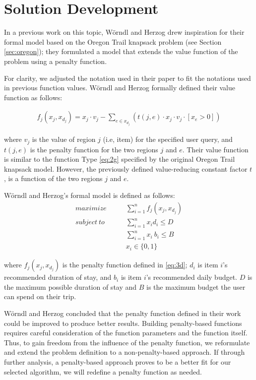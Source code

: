 
\chapter{Solution Development}\label{chapter:analysis}
In a previous work on this topic, Wörndl and Herzog  \parencite{cbrecsys2014} drew inspiration for their formal model based on the Oregon Trail knapsack problem (see Section \ref{sec:oregon}); they formulated a model that extends the value function of the problem using a penalty function.

For clarity, we adjusted the notation used in their paper to fit the notations used in previous function values. Wörndl and Herzog formally defined their value function as follows:

\begin{gather}
 \tag{1} f_j(x_j, x_{d_j}) = x_j \cdot v_j - \sum_{e \in x_{d_j}} ( t(j, e) \cdot x_j \cdot v_j \cdot [x_e > 0])\label{eq:3d}
\end{gather}

where $v_j$ is the value of region $j$ (i.e, item) for the specified user query, and $t(j, e)$ is the penalty function for the two regions $j$ and $e$. Their value function is similar to the function Type \ref{eq:2g} specified by the original Oregon Trail knapsack model. However, the previously defined value-reducing constant factor $t$, is a function of the two regions $j$ and $e$. 

Wörndl and Herzog’s formal model is defined as follows:
\begin{align}
    \tag{1}maximize \qquad  &\sum_{i=1}^n  f_j(x_j, x_{d_j}) \label{eq:3a}\\
    \tag{2}subject \ to \qquad &\sum_{i=1}^n x_i d_i  \leq D \label{eq:3b}\\
    \tag{3}&\sum_{i=1}^n x_i\ b_i \leq B \label{eq:3c}\\
    \tag{4} &x_i \in \{0,1\}
\end{align}

where $f_j(x_j, x_{d_j})$ is the penalty function defined in \ref{eq:3d}; $d_i$ is item $i$'s recommended duration of stay, and $b_i$ is item $i$'s recommended daily budget. $D$ is the maximum possible duration of stay and $B$ is the maximum budget the user can spend on their trip. 

Wörndl and Herzog concluded that the penalty function defined in their work could be improved to produce better results. Building penalty-based functions requires careful consideration of the function parameters and the function itself. Thus, to gain freedom from the influence of the penalty function, we reformulate and extend the problem definition to a non-penalty-based approach. If through further analysis, a penalty-based approach proves to be a better fit for our selected algorithm, we will redefine a penalty function as needed.

